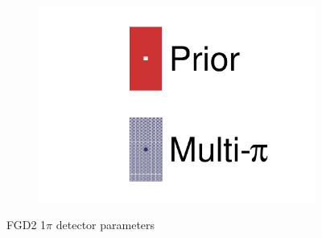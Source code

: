 \begin{figure}[h]
\begin{subfigure}[t]{0.32\textwidth}
		\includegraphics[width=\textwidth,page=41, trim={0mm 0mm 0mm 0mm}, clip]{figures/mach3/2018/data/2018a_FixedCov_RedCov_Mpi_Data_merge_drawPar_withDet}
	\end{subfigure}
	\caption{FGD2 1$\pi$ detector parameters}
	\label{fig:data_multipi_det_fdg2_cc1pi}
\end{figure}

